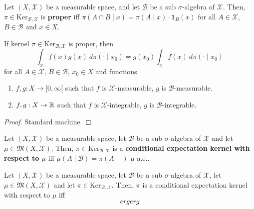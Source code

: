 \begin{definition}
    \label{def:proper-kernel}
    \leanok

    Let $(X,\mathcal{X})$ be a measurable space, and let $\mathcal{B}$ be a sub $\sigma$-algebra of $\mathcal{X}$. Then, $\pi\in\text{Ker}_{\mathcal{B},\mathcal{X}}$ is \textbf{proper} iff $\pi(A\cap B\mid x)=\pi(A\mid x)\cdot\mathbf{1}_B(x)$ for all $A\in\mathcal{X}$, $B\in\mathcal{B}$ and $x\in X$.
\end{definition}

\begin{lemma}
    \label{lem:proper-kernel-integral}
    \leanok

    If kernel $\pi\in\text{Ker}_{\mathcal{B},\mathcal{X}}$ is proper, then
    $$\int_x f(x) g(x)\ d\pi(\cdot\mid x_0) = g(x_0)\int_x f(x)\ d\pi(\cdot\mid x_0)$$
    for all $A \in \mathcal X$, $B \in \mathcal B$, $x_0 \in X$ and functions
    \begin{enumerate}
        \item $f, g : X \to [0, \infty[$ such that $f$ is $\mathcal X$-measurable, $g$ is $\mathcal B$-measurable.
        \item $f, g : X \to \mathbb R$ such that $f$ is $\mathcal X$-integrable, $g$ is $\mathcal B$-integrable.
    \end{enumerate}
\end{lemma}
\begin{proof}

    Standard machine.
\end{proof}

\begin{definition}
    \label{def:cond-exp-ker}
    \leanok

    Let $(X,\mathcal{X})$ be a measurable space, let $\mathcal{B}$ be a sub $\sigma$-algebra of $\mathcal{X}$ and let $\mu\in\mathfrak{M}(X,\mathcal{X})$. Then, $\pi\in\text{Ker}_{\mathcal{B},\mathcal{X}}$ is a \textbf{conditional expectation kernel with respect to $\mu$} iff $\mu(A\mid \mathcal{B})=\pi(A\mid\cdot)$ $\mu$-a.e..
\end{definition}

\begin{lemma}
    \label{lem:cond-exp-ker-char}
    \leanok

    Let $(X,\mathcal{X})$ be a measurable space, let $\mathcal{B}$ be a sub $\sigma$-algebra of $\mathcal{X}$, let $\mu\in\mathfrak{M}(X,\mathcal{X})$ and let $\pi\in\text{Ker}_{\mathcal{B},\mathcal{X}}$. Then, $\pi$ is a conditional expectation kernel with respect to $\mu$ iff
    \begin{equation*}
        ergerg
    \end{equation*}
\end{lemma}

